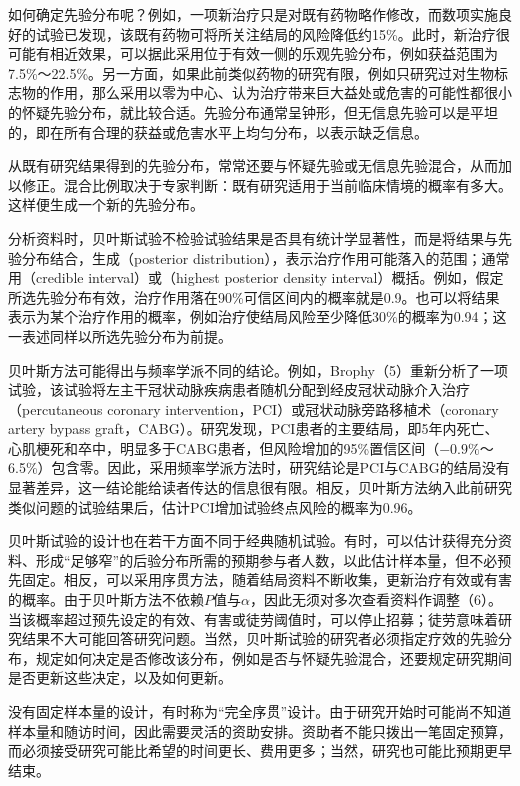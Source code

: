 如何确定先验分布呢？例如，一项新治疗只是对既有药物略作修改，而数项实施良好的试验已发现，该既有药物可将所关注结局的风险降低约15\%。此时，新治疗很可能有相近效果，可以据此采用位于有效一侧的乐观先验分布，例如获益范围为7.5\%～22.5\%。另一方面，如果此前类似药物的研究有限，例如只研究过对生物标志物的作用，那么采用以零为中心、认为治疗带来巨大益处或危害的可能性都很小的怀疑先验分布，就比较合适。先验分布通常呈钟形，但无信息先验可以是平坦的，即在所有合理的获益或危害水平上均匀分布，以表示缺乏信息。

从既有研究结果得到的先验分布，常常还要与怀疑先验或无信息先验混合，从而加以修正。混合比例取决于专家判断：既有研究适用于当前临床情境的概率有多大。这样便生成一个新的先验分布。

分析资料时，贝叶斯试验不检验试验结果是否具有统计学显著性，而是将结果与先验分布结合，生成（posterior distribution），表示治疗作用可能落入的范围；通常用（credible interval）或（highest posterior density interval）概括。例如，假定所选先验分布有效，治疗作用落在90\%可信区间内的概率就是0.9。也可以将结果表示为某个治疗作用的概率，例如治疗使结局风险至少降低30\%的概率为0.94；这一表述同样以所选先验分布为前提。

贝叶斯方法可能得出与频率学派不同的结论。例如，Brophy（5）重新分析了一项试验，该试验将左主干冠状动脉疾病患者随机分配到经皮冠状动脉介入治疗（percutaneous coronary intervention，PCI）或冠状动脉旁路移植术（coronary artery bypass graft，CABG）。研究发现，PCI患者的主要结局，即5年内死亡、心肌梗死和卒中，明显多于CABG患者，但风险增加的95\%置信区间（$-0.9\%$～6.5\%）包含零。因此，采用频率学派方法时，研究结论是PCI与CABG的结局没有显著差异，这一结论能给读者传达的信息很有限。相反，贝叶斯方法纳入此前研究类似问题的试验结果后，估计PCI增加试验终点风险的概率为0.96。

贝叶斯试验的设计也在若干方面不同于经典随机试验。有时，可以估计获得充分资料、形成“足够窄”的后验分布所需的预期参与者人数，以此估计样本量，但不必预先固定。相反，可以采用序贯方法，随着结局资料不断收集，更新治疗有效或有害的概率。由于贝叶斯方法不依赖$P$值与$\alpha$，因此无须对多次查看资料作调整（6）。当该概率超过预先设定的有效、有害或徒劳阈值时，可以停止招募；徒劳意味着研究结果不大可能回答研究问题。当然，贝叶斯试验的研究者必须指定疗效的先验分布，规定如何决定是否修改该分布，例如是否与怀疑先验混合，还要规定研究期间是否更新这些决定，以及如何更新。

没有固定样本量的设计，有时称为“完全序贯”设计。由于研究开始时可能尚不知道样本量和随访时间，因此需要灵活的资助安排。资助者不能只拨出一笔固定预算，而必须接受研究可能比希望的时间更长、费用更多；当然，研究也可能比预期更早结束。

